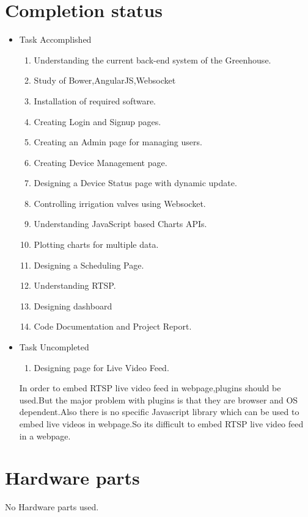 \documentclass[a4paper,12pt,oneside]{book}
\begin{document}
\section{Completion status}
\begin{itemize}
    \item{Task Accomplished}
    \setlength\itemsep{0.2cm}
        \begin{enumerate}
            \item{Understanding the current back-end system of the Greenhouse.}
            \item{Study of Bower,AngularJS,Websocket}
            \item{Installation of required software.}
            \item{Creating Login and Signup pages.}
            \item{Creating an Admin page for managing users.}
            \item{Creating Device Management page.}
            \item{Designing a Device Status page with dynamic update.}
            \item{Controlling irrigation valves using Websocket.}
            \item{Understanding JavaScript based Charts APIs.}
            \item{Plotting charts for multiple data.}
            \item{ Designing a Scheduling Page.}
            \item{Understanding RTSP.}
            \item{Designing dashboard}
            \item{Code Documentation and Project Report.}
        \end{enumerate}
    \item{Task Uncompleted}
        \begin{enumerate}
            \item{Designing page for Live Video Feed.}
        \end{enumerate}
        \par In order to embed RTSP live video feed in webpage,plugins should be used.But the major problem with plugins is that they are browser and OS dependent.Also there is no specific Javascript library which can be used to embed live videos in webpage.So its difficult to embed RTSP live video feed in a webpage.   
\end{itemize}


\newpage
\section{Hardware parts}
\hspace{7mm}No Hardware parts used.
\end{document}
